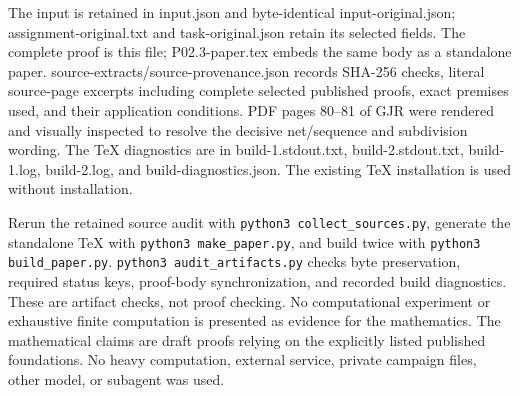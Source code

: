 \documentclass[11pt]{article}
\begin{document}
The input is retained in input.json and byte-identical input-original.json; assignment-original.txt and task-original.json retain its selected fields. The complete proof is this file; P02.3-paper.tex embeds the same body as a standalone paper. source-extracts/source-provenance.json records SHA-256 checks, literal source-page excerpts including complete selected published proofs, exact premises used, and their application conditions. PDF pages 80--81 of GJR were rendered and visually inspected to resolve the decisive net/sequence and subdivision wording. The TeX diagnostics are in build-1.stdout.txt, build-2.stdout.txt, build-1.log, build-2.log, and build-diagnostics.json. The existing TeX installation is used without installation.

Rerun the retained source audit with \texttt{python3 collect\_sources.py}, generate the standalone TeX with \texttt{python3 make\_paper.py}, and build twice with \texttt{python3 build\_paper.py}. \texttt{python3 audit\_artifacts.py} checks byte preservation, required status keys, proof-body synchronization, and recorded build diagnostics. These are artifact checks, not proof checking. No computational experiment or exhaustive finite computation is presented as evidence for the mathematics. The mathematical claims are draft proofs relying on the explicitly listed published foundations. No heavy computation, external service, private campaign files, other model, or subagent was used.
\end{document}
